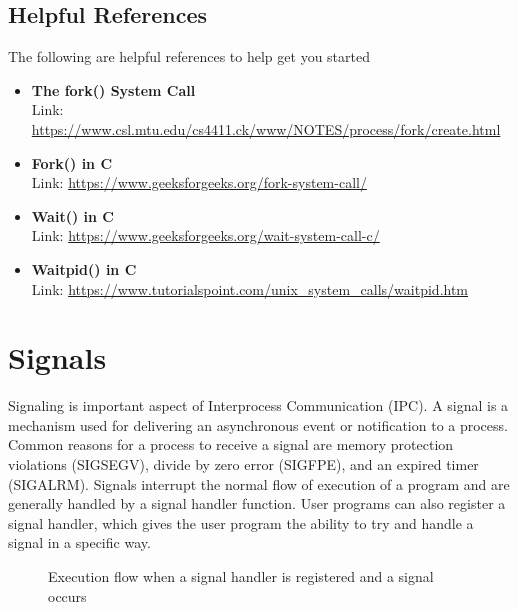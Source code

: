 \documentclass{article}
\begin{document}
\subsection*{Helpful References}
The following are helpful references to help get you started
\begin{itemize}
\item \textbf{The fork() System Call}\\
Link: \href{https://www.csl.mtu.edu/cs4411.ck/www/NOTES/process/fork/create.html}{https://www.csl.mtu.edu/cs4411.ck/www/NOTES/process/fork/create.html}
\item \textbf{Fork() in C}\\
Link: \href{https://www.geeksforgeeks.org/fork-system-call/}{https://www.geeksforgeeks.org/fork-system-call/}
\item \textbf{Wait() in C}\\
Link: \href{https://www.geeksforgeeks.org/wait-system-call-c/}{https://www.geeksforgeeks.org/wait-system-call-c/}\
\item \textbf{Waitpid() in C}\\
Link: \href{https://www.tutorialspoint.com/unix_system_calls/waitpid.htm}{https://www.tutorialspoint.com/unix\_system\_calls/waitpid.htm}
\end{itemize}







\section{Signals}
Signaling is important aspect of Interprocess Communication (IPC). A signal is a mechanism used for delivering an asynchronous event or notification to a process. Common reasons for a process to receive a signal are memory protection violations (SIGSEGV), divide by zero error (SIGFPE), and an expired timer (SIGALRM). Signals interrupt the normal flow of execution of a program and are generally handled by a signal handler function. User programs can also register a signal handler, which gives the user program the ability to try and handle a signal in a specific way.

 \begin{figure}[!htb]
        \captionsetup{justification=centering}
        \caption{Execution flow when a signal handler is registered and a signal occurs}
\end{figure}
\end{document}
